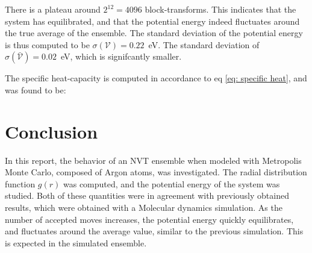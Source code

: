 \documentclass[a4paper]{article}
\newcommand{\newparagraph}{\vspace{.5cm}\noindent}
\begin{document}
There is a plateau around $2^{12} = 4096$ block-transforms. This indicates that the system has equilibrated, and that the potential energy indeed fluctuates around the true average of the ensemble.
The standard deviation of the potential energy is thus computed to be $\sigma(\mathcal{V}) = 0.22$~eV. The standard deviation of $\sigma(\bar{\mathcal{V}}) = 0.02$~eV, which is signifcantly smaller.

\newparagraph
The specific heat-capacity is computed in accordance to eq \eqref{eq: specific heat}, and was found to be: 

\newpage
\section*{Conclusion}
In this report, the behavior of an NVT ensemble when modeled with Metropolis Monte Carlo, composed of Argon atoms, was investigated.
The radial distribution function $g(r)$ was computed, and the potential energy of the system was studied. Both of these quantities were in agreement with previously obtained results, which were obtained with a Molecular dynamics simulation.
As the number of accepted moves increases, the potential energy quickly equilibrates, and fluctuates around the average value, similar to the previous simulation. This is expected in the simulated ensemble.
\end{document}
